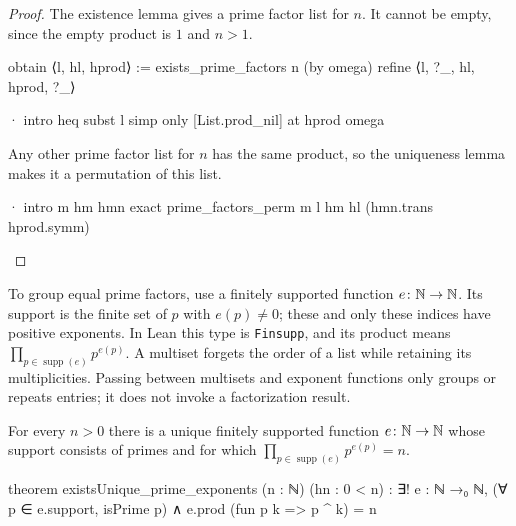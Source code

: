 \begin{proof}
  The existence lemma gives a prime factor list for $n$.
  It cannot be empty, since the empty product is $1$ and $n>1$.

  \begin{lean}
    obtain ⟨l, hl, hprod⟩ := exists_prime_factors n (by omega)
    refine ⟨l, ?_, hl, hprod, ?_⟩

    · intro heq
      subst l
      simp only [List.prod_nil] at hprod
      omega
  \end{lean}

  Any other prime factor list for $n$ has the same product, so the uniqueness lemma makes it a
  permutation of this list.

  \begin{lean}
    · intro m hm hmn
      exact prime_factors_perm m l hm hl (hmn.trans hprod.symm)
  \end{lean}

\end{proof}

To group equal prime factors, use a finitely supported function $e\colon\mathbb{N}\to\mathbb{N}$.
Its support is the finite set of $p$ with $e(p)\ne0$; these and only these indices have positive
exponents.
In Lean this type is \texttt{Finsupp}, and its product means
$\prod_{p\in\operatorname{supp}(e)}p^{e(p)}$.
A multiset forgets the order of a list while retaining its multiplicities.
Passing between multisets and exponent functions only groups or repeats entries; it does not invoke
a factorization result.

\begin{lemma}
  \label{ent:lem:unique-prime-exponents}
  For every $n>0$ there is a unique finitely supported function $e\colon\mathbb{N}\to\mathbb{N}$ whose support
  consists of primes and for which $\prod_{p\in\operatorname{supp}(e)}p^{e(p)}=n$.

  \begin{lean}
    theorem existsUnique_prime_exponents (n : ℕ) (hn : 0 < n) :
        ∃! e : ℕ →₀ ℕ, (∀ p ∈ e.support, isPrime p) ∧
          e.prod (fun p k => p ^ k) = n
  \end{lean}
\end{lemma}

